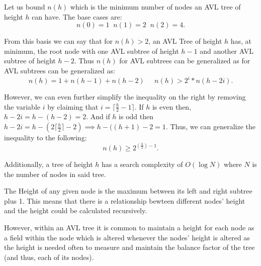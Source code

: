 \documentclass[12pt]{book}
\begin{document}
Let us bound $n(h)$ which is the minimum number of nodes an AVL tree of height  $h$
can have. The base cases are:
\[
n(0) = 1 \;\; n(1) = 2 \;\; n(2) = 4
.\] 

From this basis we can say that for $n(h)>2$, an AVL Tree of height $h$ has, at minimum,
the root node with one AVL subtree of height  $h-1$ and another AVL subtree of height
 $h-2$. Thus $n(h)$ for AVL subtrees can be generalized as for AVL subtrees can be generalized as:
 \[
 n(h) = 1 + n(h-1) + n(h-2) \;\;\;\;\; n(h) > 2^i*n(h-2i)
 .\] 

 However, we can even further simplify the inequality on the right by removing the
 variable $i$ by claiming that  $i = \lceil \frac{h}{2}-1 \rceil $. If $h$ is even
 then,  $h-2i = h-(h-2) = 2$. And if  $h$ is odd then  $h-2i = h - \left(2 \lceil \frac{h}{2} \rceil -2\right) \implies h - ((h+1)-2 = 1 $. Thus, we can generalize
 the inequality to the following:
 \[
 n(h) \geq 2^{(\frac{h}{2})-1}
 .\] 

 Additionally, a tree of height $h$ has a search complexity of  $O(\log N)$ where
  $N$ is the number of nodes in said tree.

The Height of any given node is the maximum between its left and right subtree
plus 1. This means that there is a relationship bewteen different nodes' height and
the height could be calculated recursively. 

However, within an AVL tree it is common
to maintain a height for each node as a field within the node which is altered 
whenever the nodes' height is altered as the height is needed often to measure
and maintain the balance factor of the tree (and thus, each of its nodes).
\end{document}

